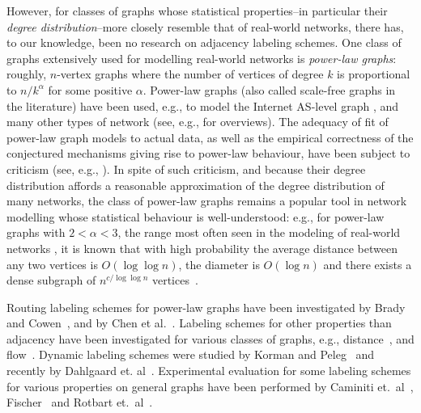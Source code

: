 \documentclass{article}
\theoremstyle{remark}
\begin{document}
However, for classes of graphs whose statistical properties--in particular their \emph{degree distribution}--more closely resemble that of real-world networks, there has, to our knowledge, been no research on adjacency labeling schemes.
One class of graphs extensively used for modelling real-world networks is \emph{power-law graphs}: roughly, $n$-vertex graphs where the number of vertices of degree $k$ is proportional to $n/k^{\alpha}$ for some positive $\alpha$. Power-law graphs (also called scale-free graphs in the literature) have been used, e.g., to model the Internet AS-level graph \cite{DBLP:journals/ton/SiganosFFF03,DBLP:conf/podc/AkellaCKS03}, and many other types of network (see, e.g., \cite{mitzenmacher2004brief,clauset2009power} for overviews). 
The adequacy of fit of power-law graph models to actual data, as well as the empirical correctness of the conjectured mechanisms giving rise to power-law behaviour, have been subject to criticism (see, e.g., \cite{DBLP:journals/jacm/AchlioptasCKM09,clauset2009power}). 
In spite of such criticism, and because their degree distribution affords a reasonable approximation of the degree distribution of many networks, the class of power-law graphs remains a popular tool in network modelling whose statistical behaviour is well-understood: e.g., for power-law graphs with $2<\alpha<3$, the range most often seen in the modeling of real-world networks \cite{clauset2009power}, it is known that with high probability the average distance between any two vertices is  $O(\log \log n)$, the diameter is $O(\log n)$ and there exists a dense subgraph of $n^{c/\log \log n}$ vertices~\cite{chung2004average}. 

Routing labeling schemes for power-law graphs  have been investigated by Brady and Cowen~\cite{brady2006compact}, and by Chen et al.~\cite{chen2012compact}. Labeling schemes for other properties than adjacency have been investigated for various classes of graphs, e.g., distance~\cite{gavoillea2004distance}, and flow~\cite{katz2004labeling}. 
Dynamic labeling schemes were studied by Korman and Peleg~\cite{korman2007compact,Korman07,korman2007general} and recently by Dahlgaard et. al~\cite{dahlgaard2014dynamic}.
Experimental evaluation for some labeling schemes for various properties on general graphs have been performed by Caminiti et.~al~\cite{caminiti2008engineering}, Fischer~\cite{fischer2009short} and Rotbart et.~al~\cite{rotbart2014evaluation}.
\end{document}
